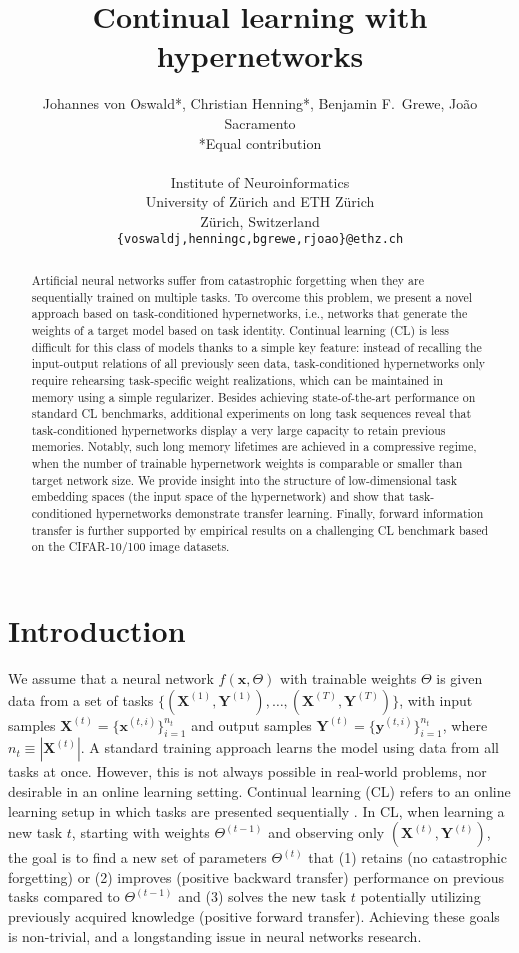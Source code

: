 \documentclass{article}
\title{Continual learning with hypernetworks}
\author{Johannes von Oswald*, Christian Henning*, Benjamin F.~Grewe, João Sacramento \\
  *Equal contribution\\
  \\
  Institute of Neuroinformatics\\
  University of Zürich and ETH Zürich\\
  Zürich, Switzerland\\
  \texttt{\{voswaldj,henningc,bgrewe,rjoao\}@ethz.ch}  
}
\begin{document}
\maketitle
\begin{abstract}

Artificial neural networks suffer from catastrophic forgetting when they are sequentially trained on multiple tasks. To overcome this problem, we present a novel approach based on task-conditioned hypernetworks, i.e., networks that generate the weights of a target model based on task identity. Continual learning (CL) is less difficult for this class of models thanks to a simple key feature: instead of recalling the input-output relations of all previously seen data, task-conditioned hypernetworks only require rehearsing task-specific weight realizations, which can be maintained in memory using a simple regularizer. Besides achieving state-of-the-art performance on standard CL benchmarks, additional experiments on long task sequences reveal that task-conditioned hypernetworks display a very large capacity to retain previous memories. Notably, such long memory lifetimes are achieved in a compressive regime, when the number of trainable hypernetwork weights is comparable or smaller than target network size.
We provide insight into the structure of low-dimensional task embedding spaces (the input space of the hypernetwork) and show that task-conditioned hypernetworks demonstrate transfer learning. Finally, forward information transfer is further supported by empirical results on a challenging CL benchmark based on the CIFAR-10/100 image datasets.
\end{abstract}

\section{Introduction}
\label{sec:intro}
We assume that a neural network $f(\mathbf{x}, \Theta)$ with trainable weights $\Theta$ is given data from a set of tasks $\{ (\mathbf{X}^{(1)}, \mathbf{Y}^{(1)}), \dots, (\mathbf{X}^{(T)}, \mathbf{Y}^{(T)}) \}$, with input samples $\mathbf{X}^{(t)} = \{ \mathbf{x}^{(t,i)} \}_{i=1}^{n_t}$ and output samples $\mathbf{Y}^{(t)} = \{ \mathbf{y}^{(t,i)} \}_{i=1}^{n_t}$, where $n_t \equiv |\mathbf{X}^{(t)}|$. A standard training approach learns the model using data from all tasks at once. However, this is not always possible in real-world problems, nor desirable in an online learning setting. Continual learning (CL) refers to an online learning setup in which tasks are presented sequentially \citep[see][for a recent review on CL]{van_de_ven_three_2019}. In CL, when learning a new task $t$, starting with weights $\Theta^{(t-1)}$ and observing only $(\mathbf{X}^{(t)}, \mathbf{Y}^{(t)})$, the goal is to find a new set of parameters $\Theta^{(t)}$ that (1) retains (no catastrophic forgetting) or (2) improves (positive backward transfer) performance on previous tasks compared to $\Theta^{(t-1)}$ and (3) solves the new task $t$ potentially utilizing previously acquired knowledge (positive forward transfer). Achieving these goals is non-trivial, and a longstanding issue in neural networks research.
\end{document}
